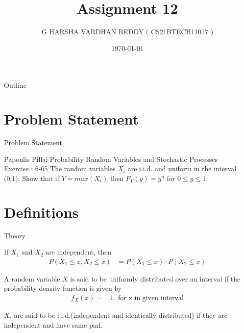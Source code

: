 \documentclass{beamer}
\title{Assignment 12}
\author{G HARSHA VARDHAN REDDY ( CS21BTECH11017 )}
\date{\today}
\begin{document}
\begin{frame}
    \titlepage 
\end{frame}

\logo{}


\begin{frame}{Outline}
    \tableofcontents
\end{frame}

\section{Problem Statement}
\begin{frame}{Problem Statement}
    \begin{block} {Papoulis Pillai Probability Random Variables and Stochastic Processes\\ 
    Exercise : 6-65}
    The random variables $X_i $ are i.i.d. and uniform in the interval (0,1). Show that if $ Y = max(X_i) $ then $F_Y(y) =y^n $ for $0 \leq y \leq 1$.
    
    \end{block}
\end{frame}
\section{Definitions}
\begin{frame}{Theory}
\begin{block}{}
If $X_1$ and $X_2$ are independent, then
\begin{align}
    P(X_1 \leq x , X_2 \leq x ) &= P(X_1\leq x) \cdot P( X_2 \leq x ) \label{1}
\end{align}
\end{block}
\begin{block}{}
A random variable $X$ is said to be uniformly distributed over an interval if the probability density function is given by
\begin{align}
    f_X(x)=&1 , \text{    for x in given interval} \label{2}
\end{align}
\end{block}
\begin{block}{}
$X_i$ are said to be i.i.d.(independent and identically distributed) if they are independent and have same pmf.
\end{block}
\end{frame}
\end{document}
